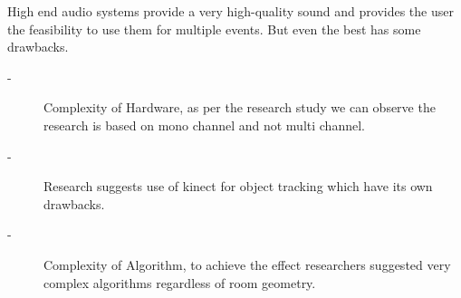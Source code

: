 \documentclass[../../../patent_v1.tex]{subfiles}
\begin{document}
High end audio systems provide a very high-quality sound and provides 
the user the feasibility to use them for multiple events. But even the 
best has some drawbacks.

\begin{description}
    \item[-]Complexity of Hardware, as per the research study we can 
            observe the research is based on mono channel and not multi channel. 
    \item[-]Research suggests use of kinect for object tracking which have its 
            own drawbacks.
    \item[-]Complexity of Algorithm, to achieve the effect researchers suggested 
            very complex algorithms regardless of room geometry.
\end{description}
\end{document}
